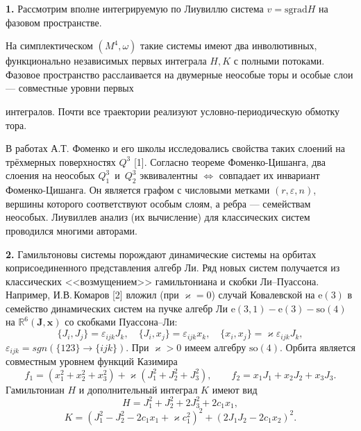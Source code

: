 


\vzmscaption


\textbf{1.} Рассмотрим вполне интегрируемую по Лиувиллю система $v = \textrm{sgrad} H$ на фазовом пространстве.

На симплектическом $(M^4, \omega)$ такие системы имеют два инволютивных, функционально независимых первых интеграла $H, K$ с полными потоками. Фазовое пространство расслаивается на двумерные неособые торы и особые слои --- совместные уровни первых{ интегралов. Почти все траектории реализуют условно-периодическую обмотку тора.

В работах А.Т. Фоменко и его школы исследовались свойства таких слоений на трёхмерных поверхностях $Q^3$ [1]. Согласно теореме Фоменко-Цишанга, два слоения на неособых $Q^3_1$~и~$Q^3_2$ эквивалентны $\Leftrightarrow$ совпадает их инвариант Фоменко-Цишанга. Он является графом с числовыми метками $(r, \varepsilon, n)$, вершины которого соответствуют особым слоям, а ребра --- семействам неособых. Лиувиллев анализ (их вычисление) для классических систем проводился многими авторами.

\textbf{2.}  Гамильтоновы системы порождают динамические системы на орбитах коприсоединенного представления алгебр Ли. Ряд новых систем получается из классических <<возмущением>> гамильтониана и скобки Ли--Пуассона. Например, И.В.\,Комаров [2] вложил (при $\varkappa =0$) случай Ковалевской на $\textrm{e}(3)$  в семейство динамических систем на пучке алгебр Ли $\textrm{e}(3,1)-\textrm{e}(3)-\textrm{so}(4)$ на $\mathbb{R}^6(\mathbf{J}, \mathbf{x})$ со скобками Пуассона--Ли: %
\[\{J_i, J_j\} =
\varepsilon_{ijk}J_k, \quad \{J_i, x_j\} = \varepsilon_{ijk}x_k,
\quad \{x_i, x_j\} = \varkappa \varepsilon_{ijk}J_k, \]%
$\varepsilon_{ijk} = sgn(\{123\} \rightarrow \{ijk\})$. При  $\varkappa>0$ имеем алгебру $\textrm{so}(4)$. Орбита является совместным уровнем функций Казимира
%
\[f_1 = (x_1^2 + x_2^2 + x_3^2) + \varkappa (J_1^2 +J_2^2 +J_3^2),
\qquad  f_2 = x_1 J_1 + x_2 J_2 +x_3 J_3.\]
%
Гамильтониан $H$ и дополнительный интеграл $K$ имеют вид
%
\[H = J_1^2 + J_2^2 + 2J_3^2 + 2 c_1 x_1, \]
\[K = (J_1^2 - J_2^2-2c_1 x_1 + \varkappa
c_1^2)^2 + (2J_1 J_2 - 2 c_1 x_2)^2.\]

}
